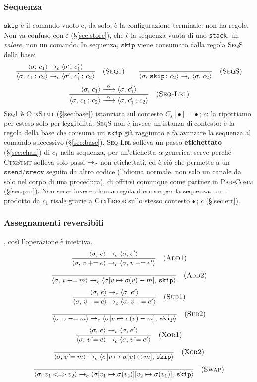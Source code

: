 \subsubsection{Sequenza}
\label{sec:seq}
$\mathtt{skip}$ è il comando vuoto e, da solo, è la configurazione
terminale: non ha regole. Non va confuso con $\varepsilon$
(\S\ref{sec:store}), che è la sequenza vuota di uno \texttt{stack}, un
\emph{valore}, non un comando. In sequenza, $\mathtt{skip}$ viene consumato
dalla regola \textsc{SeqS} della base:
\[
\dfrac{\cfg{c_1}{\sigma} \toc \cfg{c_1'}{\sigma'}}
      {\cfg{c_1\,;\,c_2}{\sigma} \toc \cfg{c_1'\,;\,c_2}{\sigma'}} \rname{Seq1}
\qquad
\dfrac{}{\cfg{\mathtt{skip}\,;\,c_2}{\sigma} \toc \cfg{c_2}{\sigma}} \rname{SeqS}
\]
\[
\dfrac{\cfg{c_1}{\sigma} \xrightarrow{\ \alpha\ } \cfg{c_1'}{\sigma}}
      {\cfg{c_1\,;\,c_2}{\sigma} \xrightarrow{\ \alpha\ } \cfg{c_1'\,;\,c_2}{\sigma}} \rname{Seq-Lbl}
\]
\textsc{Seq1} è \textsc{CtxStmt} (\S\ref{sec:base}) istanziata sul contesto
$C_s[\bullet] = \bullet\,;\,c$: la riportiamo per esteso solo per leggibilità.
\textsc{SeqS} non è invece un'istanza di contesto: è la regola della base che
consuma un $\mathtt{skip}$ già raggiunto e fa avanzare la sequenza al comando
successivo (\S\ref{sec:base}). \textsc{Seq-Lbl}
solleva un passo \textbf{etichettato} (\S\ref{sec:chan}) di $c_1$ nella
sequenza, per un'etichetta $\alpha$ generica: serve perché \textsc{CtxStmt}
solleva solo passi $\toc$ non etichettati, ed è ciò che permette a un
$\mathtt{ssend}/\mathtt{srecv}$ seguito da altro codice (l'idioma normale,
non solo un canale da solo nel corpo di una procedura), di offrirsi comunque
come partner in \textsc{Par-Comm} (\S\ref{sec:par}). Non serve invece alcuna
regola d'errore per la sequenza: un $\err$ prodotto da $c_1$ risale grazie a
\textcolor{red!60!black}{\textsc{CtxError}} sullo stesso contesto
$\bullet\,;\,c$ (\S\ref{sec:err}).

\subsubsection{Assegnamenti reversibili}
\label{sec:assign}
, così l'operazione è iniettiva.
\[
\dfrac{\cfg{e}{\sigma} \toe \cfg{e'}{\sigma}}
      {\cfg{v \mathbin{+\!\!=} e}{\sigma} \toc \cfg{v \mathbin{+\!\!=} e'}{\sigma}} \rname{Add1}
\]
\[
\dfrac{}{\cfg{v \mathbin{+\!\!=} m}{\sigma} \toc \cfg{\mathtt{skip}}{\upd{\sigma}{v}{\sigma(v)+m}}} \rname{Add2}
\]
\[
\dfrac{\cfg{e}{\sigma} \toe \cfg{e'}{\sigma}}
      {\cfg{v \mathbin{-\!\!=} e}{\sigma} \toc \cfg{v \mathbin{-\!\!=} e'}{\sigma}} \rname{Sub1}
\]
\[
\dfrac{}{\cfg{v \mathbin{-\!\!=} m}{\sigma} \toc \cfg{\mathtt{skip}}{\upd{\sigma}{v}{\sigma(v)-m}}} \rname{Sub2}
\]
\[
\dfrac{\cfg{e}{\sigma} \toe \cfg{e'}{\sigma}}
      {\cfg{v \mathbin{\hat{}\!=} e}{\sigma} \toc \cfg{v \mathbin{\hat{}\!=} e'}{\sigma}} \rname{Xor1}
\]
\[
\dfrac{}{\cfg{v \mathbin{\hat{}\!=} m}{\sigma} \toc \cfg{\mathtt{skip}}{\upd{\sigma}{v}{\sigma(v)\xor m}}} \rname{Xor2}
\]
\[
\dfrac{}{\cfg{v_1 \mathbin{<\!=\!>} v_2}{\sigma} \toc \cfg{\mathtt{skip}}{\upd{\upd{\sigma}{v_1}{\sigma(v_2)}}{v_2}{\sigma(v_1)}}} \rname{Swap}
\]

